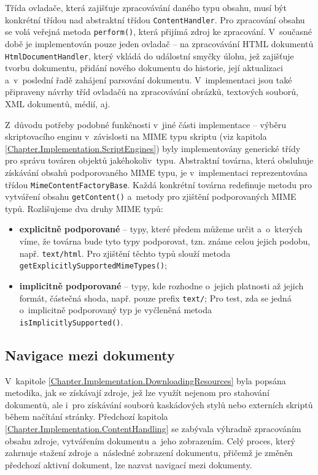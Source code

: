Třída ovladače, která zajišťuje zpracovávání daného typu obsahu, musí být konkrétní třídou nad abstraktní třídou \texttt{ContentHandler}. Pro zpracování obsahu se volá veřejná metoda \texttt{perform()}, která přijímá zdroj ke zpracování. V~současné době je implementován pouze jeden ovladač -- na zpracovávání HTML dokumentů \texttt{HtmlDocumentHandler}, který vkládá do událostní smyčky úlohu, jež zajišťuje tvorbu dokumentu, přidání nového dokumentu do historie, její aktualizaci a~v~poslední řadě zahájení parsování dokumentu. V~implementaci jsou také připraveny návrhy tříd ovladačů na zpracovávání obrázků, textových souborů, XML dokumentů, médií, aj.

Z~důvodu potřeby podobné funkčnosti v~jiné části implementace -- výběru skriptovacího enginu v~závislosti na MIME typu skriptu (viz kapitola \ref{Chapter.Implementation.ScriptEngines}) byly implementovány generické třídy pro správu továren objektů jakéhokoliv~typu. Abstraktní továrna, která obsluhuje získávání obsahů podporovaného MIME typu, je v~implementaci reprezentována třídou \texttt{MimeContentFactoryBase}. Každá konkrétní továrna redefinuje metodu pro vytváření obsahu \texttt{getContent()} a~metody pro zjištění podporovaných MIME typů. Rozlišujeme dva druhy MIME typů:

\begin{itemize}
  \item \textbf{explicitně podporované} -- typy, které předem můžeme určit a~o~kterých víme, že továrna bude tyto typy podporovat, tzn. známe celou jejich podobu, např. \texttt{text/html}. Pro zjištění těchto typů slouží metoda \texttt{getExplicitlySupportedMimeTypes()};
  \item \textbf{implicitně podporované} -- typy, kde rozhodne o~jejich platnosti až jejich formát, částečná shoda, např. pouze prefix \texttt{text/}; Pro test, zda se jedná o~implicitně podporovaný typ je vyčleněná metoda \texttt{isImplicitlySupported()}.
\end{itemize}

\subsection{Navigace mezi dokumenty}
\label{Chapter.Implementation.DocumentNavigation}

V~kapitole \ref{Chapter.Implementation.DownloadingResources} byla popsána metodika, jak se získávají zdroje, jež lze využít nejenom pro stahování dokumentů, ale i~pro získávání souborů kaskádových stylů nebo externích skriptů během načítání stránky. Předchozí kapitola \ref{Chapter.Implementation.ContentHandling} se zabývala výhradně zpracováním obsahu zdroje, vytvářením dokumentu a~jeho zobrazením. Celý proces, který zahrnuje stažení zdroje a~následné zobrazení dokumentu, přičemž je změněn předchozí aktivní dokument, lze nazvat navigací mezi dokumenty.


